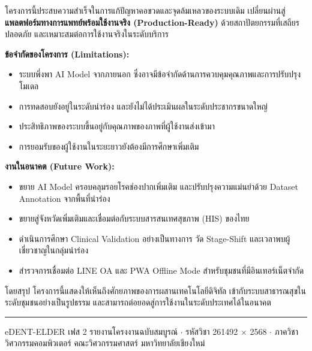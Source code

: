 โครงการนี้ประสบความสำเร็จในการแก้ปัญหาคอขวดและจุดล้มเหลวของระบบเดิม
เปลี่ยนผ่านสู่ \textbf{แพลตฟอร์มทางการแพทย์พร้อมใช้งานจริง (Production-Ready)}
ด้วยสถาปัตยกรรมที่เสถียร ปลอดภัย และเหมาะสมต่อการใช้งานจริงในระดับบริการ
\vspace{0.5em}
\begin{tcolorbox}[graybox]
  \textbf{ข้อจำกัดของโครงการ (Limitations):}
  \begin{itemize}[leftmargin=1.4em, itemsep=3pt]
    \item ระบบพึ่งพา AI Model จากภายนอก
          ซึ่งอาจมีข้อจำกัดด้านการควบคุมคุณภาพและการปรับปรุงโมเดล
    \item การทดสอบยังอยู่ในระดับนำร่อง
          และยังไม่ได้ประเมินผลในระดับประชากรขนาดใหญ่
    \item ประสิทธิภาพของระบบขึ้นอยู่กับคุณภาพของภาพที่ผู้ใช้งานส่งเข้ามา
    \item การยอมรับของผู้ใช้งานในระยะยาวยังต้องมีการศึกษาเพิ่มเติม
  \end{itemize}
\end{tcolorbox}
\vspace{0.5em}
\begin{tcolorbox}[graybox]
  \textbf{งานในอนาคต (Future Work):}
  \begin{itemize}[leftmargin=1.4em, itemsep=3pt]
    \item ขยาย AI Model ครอบคลุมรอยโรคช่องปากเพิ่มเติม
          และปรับปรุงความแม่นยำด้วย Dataset Annotation จากพื้นที่นำร่อง
    \item ขยายสู่จังหวัดเพิ่มเติมและเชื่อมต่อกับระบบสารสนเทศสุขภาพ (HIS) ของไทย
    \item ดำเนินการศึกษา Clinical Validation อย่างเป็นทางการ
          วัด Stage-Shift และเวลาพบผู้เชี่ยวชาญในกลุ่มนำร่อง
    \item สำรวจการเชื่อมต่อ LINE OA และ PWA Offline Mode
          สำหรับชุมชนที่มีอินเทอร์เน็ตจำกัด
  \end{itemize}
\end{tcolorbox}
\vspace{0.5em}
โดยสรุป โครงการนี้แสดงให้เห็นถึงศักยภาพของการผสานเทคโนโลยีดิจิทัล
เข้ากับระบบสาธารณสุขในระดับชุมชนอย่างเป็นรูปธรรม
และสามารถต่อยอดสู่การใช้งานในระดับประเทศได้ในอนาคต
\vfill
{\color{primaryblue}\rule{\linewidth}{1pt}}
\begin{center}
  \small\color{medgray}
  eDENT-ELDER เฟส 2 รายงานโครงงานฉบับสมบูรณ์ $\cdot$
  รหัสวิชา 261492 $\times$ 2568 $\cdot$
  ภาควิชาวิศวกรรมคอมพิวเตอร์ คณะวิศวกรรมศาสตร์ มหาวิทยาลัยเชียงใหม่
\end{center}
